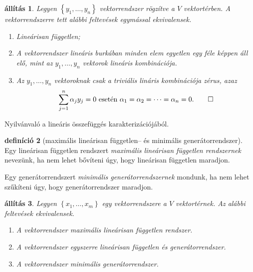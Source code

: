 \documentclass[9pt,showtrims]{memoir}
\makeatletter
\renewenvironment{proof}[1][\proofname]
    {\par\pushQED{\qed}%
    \normalfont \topsep6\p@\@plus6\p@\relax
    \trivlist
    \item[\hskip\labelsep
        \itshape
    #1\@addpunct{:}]\ignorespaces}
    {\popQED\endtrivlist\@endpefalse}
\theoremstyle{plain}
\newtheorem{proposition}{állítás}[chapter]
\theoremstyle{remark}
\theoremstyle{definition}
\newtheorem{definition}[proposition]{definíció}
\makeatother
\begin{document}
\begin{proposition}
    Legyen $\left\{ y_1,\dots,y_n \right\}$ vektorrendszer rögzítve a $V$ vektortérben.
    A vektorrendszerre tett alábbi feltevések egymással ekvivalensek.
    \begin{enumerate}
        \item Lineárisan független;
        \item A vektorrendszer lineáris burkában minden elem egyetlen egy féle képpen áll elő,
            mint az $y_1,\dots,y_n$ vektorok lineáris kombinációja.
        \item Az $y_1,\dots,y_n$ vektoroknak csak a triviális lináris kombinációja zérus,
            azaz
            \[
                \sum_{j=1}^n\alpha_jy_j=0\text{ esetén }\alpha_1=\alpha_2=\dots=\alpha_n=0.\qedhere
            \]
    \end{enumerate}
\end{proposition}
\begin{proof}
    Nyilvánvaló a lineáris összefüggés karakterizációjából.
\end{proof}
\begin{definition}[maximális lineárisan független-- és minimális generátorrendszer]
    Egy lineárisan független rendszert \emph{maximális lineárisan független rendszernek} nevezünk,
    ha nem lehet bővíteni úgy, hogy lineárisan független maradjon.

    Egy generátorrendszert \emph{minimális generátorrendszernek} mondunk, ha nem lehet szűkíteni úgy,
    hogy generátorrendszer maradjon.
\end{definition}
\begin{proposition}
    Legyen $\left\{ x_1,\dots,x_m \right\}$ egy vektorrendszere a $V$ vektortérnek.
    Az alábbi feltevések ekvivalensek.
    \begin{enumerate}
        \item A vektorrendszer maximális lineárisan független rendszer.
        \item A vektorrendszer egyszerre lineárisan független és generátorrendszer.
        \item A vektorrendszer minimális generátorrendszer.\qedhere
    \end{enumerate}
\end{proposition}
\end{document}
